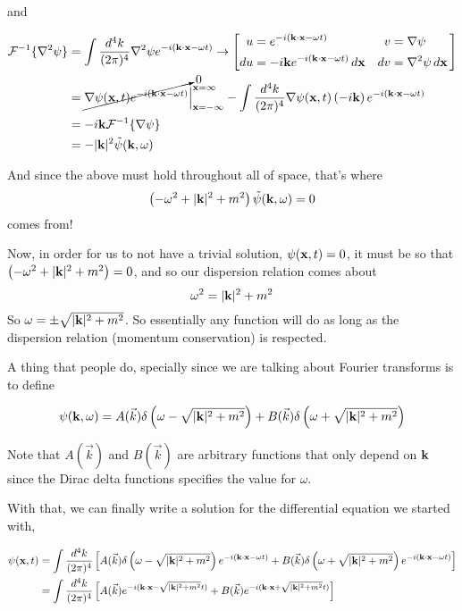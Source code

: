 and

\begin{align*}
\mathcal{F}^{-1}\{ \nabla^2 \psi \} &=
    \int \frac{d^4k}{(2\pi)^4} \nabla^2 \psi e^{-i(\boldsymbol{\mathbf{k}}\cdot\boldsymbol{\mathbf{x}} - \omega t)}
\rightarrow
\left[
    \begin{alignedat}{2}
        u  &= e^{-i(\boldsymbol{\mathbf{k}}\cdot\boldsymbol{\mathbf{x}} - \omega t)}                          \quad & v  &= \nabla \psi \\
        du &= -i\boldsymbol{\mathbf{k}} e^{-i(\boldsymbol{\mathbf{k}}\cdot\boldsymbol{\mathbf{x}} - \omega t)} \, d\boldsymbol{\mathbf{x}}  \quad & dv &= \nabla^2 \psi \, d\boldsymbol{\mathbf{x}}
    \end{alignedat}\,
\right] \\
&= \cancelto{0}{ \nabla\psi(\boldsymbol{\mathbf{x}}, t) e^{-i(\boldsymbol{\mathbf{k}}\cdot\boldsymbol{\mathbf{x}} - \omega t)} } \Big|_{\boldsymbol{\mathbf{x}}=-\infty}^{\boldsymbol{\mathbf{x}}=\infty}
    - \int \frac{d^4k}{(2\pi)^4} \nabla\psi(\boldsymbol{\mathbf{x}}, t) \left(-i\boldsymbol{\mathbf{k}}\right) e^{-i(\boldsymbol{\mathbf{k}}\cdot\boldsymbol{\mathbf{x}} - \omega t)} \\
&= -i\boldsymbol{\mathbf{k}} \mathcal{F}^{-1}\{ \nabla \psi \} \\
&= - |\boldsymbol{\mathbf{k}}|^2 \tilde{\psi} (\boldsymbol{\mathbf{k}}, \omega)
\end{align*}



And since the above must hold throughout all of space, that's where
$$
\left(-\omega^2 + |\boldsymbol{\mathbf{k}}|^2 + m^2 \right) \tilde{\psi}(\boldsymbol{\mathbf{k}}, \omega) = 0
$$
comes from!

Now, in order for us to not have a trivial solution, $\psi(\boldsymbol{\mathbf{x}}, t) = 0$, it must be so that
$\left(-\omega^2 + |\boldsymbol{\mathbf{k}}|^2 + m^2 \right) = 0$, and so our dispersion relation comes about
$$
\omega^2 = |\boldsymbol{\mathbf{k}}|^2 + m^2
$$
So $\omega = \pm \sqrt{ |\boldsymbol{\mathbf{k}}|^2 + m^2 }$.
So essentially any function will do as long as the dispersion relation (momentum conservation) is respected.

A thing that people do, specially since we are talking about Fourier transforms is to define

$$
\psi(\boldsymbol{\mathbf{k}}, \omega) = A(\vec{k}) \delta\left( \omega - \sqrt{ |\boldsymbol{\mathbf{k}}|^2 + m^2 }\right) +
    B(\vec{k}) \delta\left( \omega + \sqrt{ |\boldsymbol{\mathbf{k}}|^2 + m^2 }\right)
$$

Note that $A(\vec{k})$ and $B(\vec{k})$ are arbitrary functions that only depend on $\boldsymbol{\mathbf{k}}$ since the
Dirac delta functions specifies the value for $\omega$.

With that, we can finally write a solution for the differential equation we started with,

\begin{align*}
\psi(\boldsymbol{\mathbf{x}}, t) &=
    \int \frac{d^4k}{(2\pi)^4} \left[
        A(\vec{k}) \delta\left( \omega - \sqrt{ |\boldsymbol{\mathbf{k}}|^2 + m^2 }\right) e^{-i(\boldsymbol{\mathbf{k}}\cdot\boldsymbol{\mathbf{x}} -\omega t)} +
        B(\vec{k}) \delta\left( \omega + \sqrt{ |\boldsymbol{\mathbf{k}}|^2 + m^2 }\right) e^{-i(\boldsymbol{\mathbf{k}}\cdot\boldsymbol{\mathbf{x}} -\omega t)}
    \right] \\
&= \int \frac{d^4k}{(2\pi)^4} \left[
    A(\vec{k}) e^{-i(\boldsymbol{\mathbf{k}}\cdot\boldsymbol{\mathbf{x}} - \sqrt{ |\boldsymbol{\mathbf{k}}|^2 + m^2 } t)} +
    B(\vec{k}) e^{-i(\boldsymbol{\mathbf{k}}\cdot\boldsymbol{\mathbf{x}} + \sqrt{ |\boldsymbol{\mathbf{k}}|^2 + m^2 } t)}
\right]
\end{align*}

